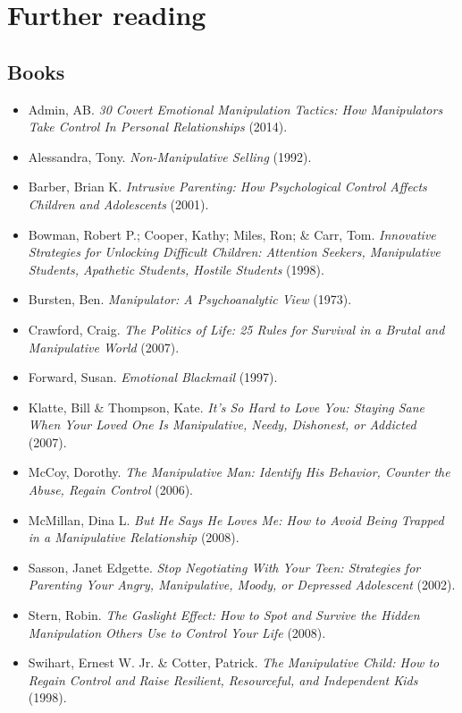 \documentclass{book}
\numberwithin{equation}{section}
\begin{document}
\section{Further reading}

\subsection{Books}
\begin{itemize}
    \item Admin, AB. \textit{30 Covert Emotional Manipulation Tactics: How Manipulators Take Control In Personal Relationships} (2014).
    \item Alessandra, Tony. \textit{Non-Manipulative Selling} (1992).
    \item Barber, Brian K. \textit{Intrusive Parenting: How Psychological Control Affects Children and Adolescents} (2001).
    \item Bowman, Robert P.; Cooper, Kathy; Miles, Ron; \& Carr, Tom. \textit{Innovative Strategies for Unlocking Difficult Children: Attention Seekers, Manipulative Students, Apathetic Students, Hostile Students} (1998).
    \item Bursten, Ben. \textit{Manipulator: A Psychoanalytic View} (1973).
    \item Crawford, Craig. \textit{The Politics of Life: 25 Rules for Survival in a Brutal and Manipulative World} (2007).
    \item Forward, Susan. \textit{Emotional Blackmail} (1997).
    \item Klatte, Bill \& Thompson, Kate. \textit{It's So Hard to Love You: Staying Sane When Your Loved One Is Manipulative, Needy, Dishonest, or Addicted} (2007).
    \item McCoy, Dorothy. \textit{The Manipulative Man: Identify His Behavior, Counter the Abuse, Regain Control} (2006).
    \item McMillan, Dina L. \textit{But He Says He Loves Me: How to Avoid Being Trapped in a Manipulative Relationship} (2008).
    \item Sasson, Janet Edgette. \textit{Stop Negotiating With Your Teen: Strategies for Parenting Your Angry, Manipulative, Moody, or Depressed Adolescent} (2002).
    \item Stern, Robin. \textit{The Gaslight Effect: How to Spot and Survive the Hidden Manipulation Others Use to Control Your Life} (2008).
    \item Swihart, Ernest W. Jr. \& Cotter, Patrick. \textit{The Manipulative Child: How to Regain Control and Raise Resilient, Resourceful, and Independent Kids} (1998).
\end{itemize}
\end{document}
